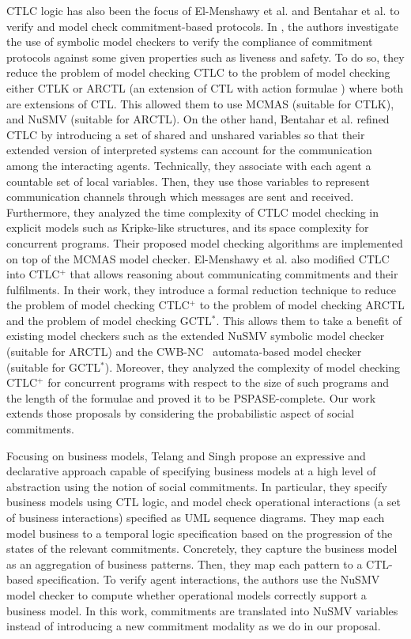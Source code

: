 CTLC logic \cite{El-Menshawy2011a} has also been the focus of
El-Menshawy et al. \cite{El-Menshawy2011b,El-Menshawy2013a} and Bentahar et al. \cite{Bentahar2012} to verify and model check commitment-based protocols. In \cite{El-Menshawy2011b}, the authors investigate the use of
symbolic model checkers to verify the compliance of commitment
protocols against some given properties such as liveness and
safety. To do so, they reduce the problem of model checking CTLC
to the problem of model checking either CTLK or ARCTL (an
extension of CTL with action formulae \cite{Pecheur2006}) where
both are extensions of CTL. This allowed them to use MCMAS
(suitable for CTLK), and NuSMV (suitable for ARCTL). On the other
hand, Bentahar et al. \cite{Bentahar2012} refined CTLC by
introducing a set of shared and unshared variables so that their
extended version of interpreted systems can account for the
communication among the interacting agents. Technically, they
associate with each agent a countable set of local variables.
Then, they use those variables to represent communication channels
through which messages are sent and received.
Furthermore, they analyzed the time complexity of CTLC model
checking in explicit models such as Kripke-like structures, and
its space complexity for concurrent programs. Their proposed model
checking algorithms are implemented on top of the MCMAS model
checker. El-Menshawy et al. \cite{El-Menshawy2013a} also modified
CTLC into CTLC$^+$ that allows reasoning about communicating
commitments and their fulfilments. In their work, they introduce a
formal reduction technique to reduce the problem of model checking
CTLC$^+$ to the problem of model checking ARCTL and the problem of
model checking GCTL$^*$. This allows them to take a benefit of
existing model checkers such as the extended NuSMV symbolic model
checker (suitable for ARCTL) and the
CWB-NC~%
automata-based model checker (suitable for GCTL$^*$). Moreover,
they analyzed the complexity of model checking CTLC$^+$ for
concurrent programs with respect to the size of such programs and
the length of the formulae and proved it to be PSPASE-complete.
Our work extends those proposals by considering the probabilistic
aspect of social commitments.

Focusing on business models, Telang and Singh \cite{Telang2012}
propose an expressive and declarative approach capable of
specifying business models at a high level of abstraction using
the notion of social commitments. In particular, they specify
business models using CTL logic, and model check operational
interactions (a set of business interactions) specified as UML
sequence diagrams. They map each model business to a temporal
logic specification based on the progression of the states of the
relevant commitments. Concretely, they capture the business model
as an aggregation of business patterns. Then, they map each
pattern to a CTL-based specification. To verify agent
interactions, the authors use the NuSMV model checker to compute
whether operational models correctly support a business model. In
this work, commitments are translated into NuSMV variables instead
of introducing a new commitment modality as we do in our proposal.


